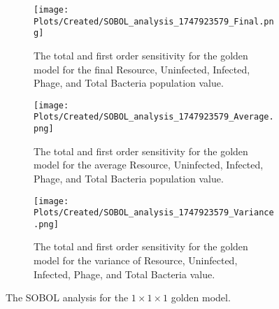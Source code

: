 \begin{figure}
    \centering
    \begin{subfigure}{0.49\linewidth}
        \centering
        \texttt{[image: Plots/Created/SOBOL\_analysis\_1747923579\_Final.png]}
        \caption{
            The total and first order sensitivity for the golden model for the final Resource, Uninfected, Infected, Phage, and Total Bacteria population value. 
        }
        \label{fig:created:SOBOL_final}
    \end{subfigure}
    \hfill
    \begin{subfigure}{0.49\linewidth}
        \centering
        \texttt{[image: Plots/Created/SOBOL\_analysis\_1747923579\_Average.png]}
        \caption{
            The total and first order sensitivity for the golden model for the average Resource, Uninfected, Infected, Phage, and Total Bacteria population value. 
        }
        \label{fig:created:SOBOL_average}
    \end{subfigure}
    \hfill
    \begin{subfigure}{0.49\linewidth}
        \centering
        \texttt{[image: Plots/Created/SOBOL\_analysis\_1747923579\_Variance.png]}
        \caption{
            The total and first order sensitivity for the golden model for the variance of Resource, Uninfected, Infected, Phage, and Total Bacteria value. 
        }
        \label{fig:created:SOBOL_variance}
    \end{subfigure}
    \caption{The SOBOL analysis for the $1\times 1 \times 1$ golden model. }
\end{figure}
